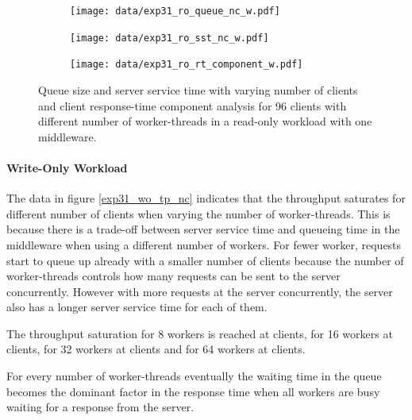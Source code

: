 \documentclass[report.tex]{subfiles}
\begin{document}


\begin{figure}
	\begin{subfigure}[b]{.33\linewidth}
		\centering
		\texttt{[image: data/exp31\_ro\_queue\_nc\_w.pdf]}
		\caption{}\label{exp31_ro_q}
	\end{subfigure}\hfill
	\begin{subfigure}[b]{.33\linewidth}
		\centering
		\texttt{[image: data/exp31\_ro\_sst\_nc\_w.pdf]}
		\caption{}\label{exp31_ro_sst}
	\end{subfigure}\hfill
	\begin{subfigure}[b]{.33\linewidth}
		\centering
		\texttt{[image: data/exp31\_ro\_rt\_component\_w.pdf]}
		\caption{}\label{exp31_ro_rtcomp}
	\end{subfigure}
	\caption{Queue size and server service time with varying number of clients and client response-time component analysis for 96 clients with different number of worker-threads in a read-only workload with one middleware.}
\end{figure}


\paragraph{Write-Only Workload}


The data in figure \ref{exp31_wo_tp_nc} indicates that the throughput saturates for different number of clients when varying the number of worker-threads. This is because there is a trade-off between server service time and queueing time in the middleware when using a different number of workers. For fewer worker, requests start to queue up already with a smaller number of clients because the number of worker-threads controls how many requests can be sent to the server concurrently. However with more requests at the server concurrently, the server also has a longer server service time for each of them.

The throughput saturation for 8 workers is reached at  clients, for 16 workers at  clients, for 32 workers at  clients and for 64 workers at  clients.

For every number of worker-threads eventually the waiting time in the queue becomes the dominant factor in the response time when all workers are busy waiting for a response from the server.
\end{document}
